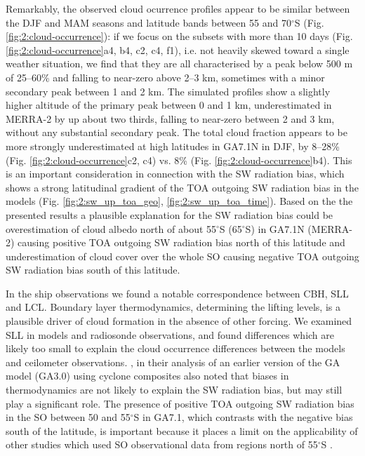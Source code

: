 Remarkably, the observed cloud ocurrence profiles appear
to be similar between the DJF and MAM seasons and
latitude bands between 55 and 70$^\circ$S (Fig. \ref{fig:2:cloud-occurrence}):
if we focus on the subsets with more than 10 days (Fig. \ref{fig:2:cloud-occurrence}a4, b4, c2, c4, f1),
i.e. not heavily skewed toward a single weather situation,
we find that they are
all characterised by a peak below 500 m of 25--60\% and falling to near-zero
above 2--3 km, sometimes with a minor secondary peak between 1 and 2 km.
The simulated profiles show a slightly higher altitude of the primary peak
between 0 and 1 km, underestimated in MERRA-2 by up about two thirds,
falling to near-zero between 2 and 3 km, without any substantial secondary peak.
The total cloud fraction appears to be more strongly underestimated at high
latitudes in GA7.1N in DJF, by 8--28\% (Fig. \ref{fig:2:cloud-occurrence}c2, c4)
vs. 8\% (Fig. \ref{fig:2:cloud-occurrence}b4).
This is an important consideration in connection with the SW radiation bias, which shows a strong
latitudinal gradient of the TOA outgoing SW radiation bias in the models
(Fig. \ref{fig:2:sw_up_toa_geo}, \ref{fig:2:sw_up_toa_time}). Based on the the
presented results a plausible explanation for the SW radiation bias could be
overestimation of cloud albedo north of about 55$^\circ$S (65$^\circ$S) in
GA7.1N (MERRA-2) causing positive TOA outgoing SW radiation bias north of this
latitude and underestimation of cloud cover over the whole SO causing negative
TOA outgoing SW radiation bias south of this latitude.

In the ship observations we found a notable correspondence between CBH, SLL and
LCL. Boundary layer thermodynamics, determining the lifting levels, is a
plausible driver of cloud formation in the absence of other forcing. We
examined SLL in models and radiosonde observations, and found differences which
are likely too small to explain the cloud occurrence differences between the
models and ceilometer observations. \cite{bodas-salcedo2012}, in their analysis
of an earlier version of the GA model (GA3.0) using cyclone composites also
noted that biases in thermodynamics are not likely to explain the SW radiation
bias, but may still play a significant role. The presence of positive TOA
outgoing SW radiation bias in the SO between 50 and 55$^\circ$S in GA7.1, which
contrasts with the negative bias south of the latitude, is important because it
places a limit on the applicability of other studies which used SO
observational data from regions north of 55$^\circ$S \citep{lang2018}.

